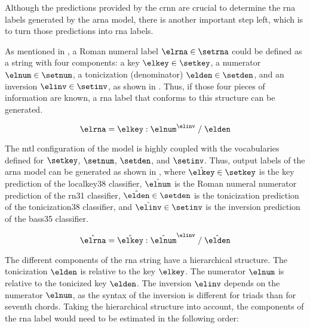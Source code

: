 
Although the predictions provided by the \gls{crnn} are
crucial to determine the \gls{rna} labels generated by the
\gls{arna} model, there is another important step left,
which is to turn those predictions into \gls{rna} labels.

As mentioned in
, a Roman
numeral label $\elrna \in \setrna$ could be defined as a
string with four components: a key $\elkey \in \setkey$, a
numerator $\elnum \in \setnum$, a tonicization (denominator)
$\elden \in \setden$, and an inversion $\elinv \in \setinv$,
as shown in . Thus, if those four pieces of
information are known, a \gls{rna} label that conforms to
this structure can be generated.

\begin{equation}
    \label{eq:rna}
    \elrna = \elkey : \elnum^{\elinv} \; / \; \elden
\end{equation}


The \gls{mtl} configuration of the model is highly coupled
with the vocabularies defined for $\setkey$, $\setnum$,
$\setden$, and $\setinv$. Thus, output labels of the
\gls{arna} model can be generated as shown in
, where $\hat{\elkey} \in \setkey$ is the
key prediction of the \gls{localkey38} classifier,
$\hat{\elnum}$ is the Roman numeral numerator prediction of
the \gls{rn31} classifier, $\hat{\elden} \in \setden$ is the
tonicization prediction of the \gls{tonicization38}
classifier, and $\hat{\elinv} \in \setinv$ is the inversion
prediction of the \gls{bass35} classifier.

\begin{equation}
    \label{eq:rna_pred}
    \hat{\elrna} = \hat{\elkey} : \hat{\elnum}^{\elinv} \; / \; \hat{\elden}
\end{equation}

The different components of the \gls{rna} string have a
hierarchical structure. The tonicization $\elden$ is
relative to the key $\elkey$. The numerator $\elnum$ is
relative to the tonicized key $\elden$. The inversion
$\elinv$ depends on the numerator $\elnum$, as the syntax of
the inversion is different for triads than for seventh
chords. Taking the hierarchical structure into account, the
components of the \gls{rna} label would need to be estimated
in the following order:

